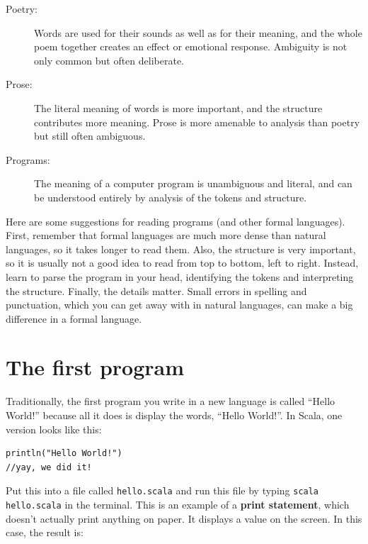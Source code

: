 \documentclass[10pt]{book}
\begin{document}
\begin{description}

\item[Poetry:] Words are used for their sounds as well as for their meaning, and the whole poem 
together creates an effect or emotional response.  Ambiguity is not only common but often deliberate.

\item[Prose:] The literal meaning of words is more important, and the structure contributes more 
meaning.  Prose is more amenable to analysis than poetry but still often ambiguous.

\item[Programs:] The meaning of a computer program is unambiguous and literal, and can be understood entirely by analysis of the tokens and structure.

\end{description}

Here are some suggestions for reading programs (and other formal languages).  First, remember that formal languages are much more dense than natural languages, so it takes longer to read them.  Also, the structure is very important, so it is usually not a good idea to read from top to bottom, left to right.  Instead, learn to parse the program in your head, identifying the tokens and interpreting the structure.  Finally, the details matter.  Small errors in spelling and punctuation, which you can get away with in natural languages, can make a big difference in a formal language.

\section{The first program}
\label{hello}


Traditionally, the first program you write in a new language is called ``Hello World!'' 
because all it does is display the words, ``Hello World!''.  In Scala, one version looks 
like this:

\beforeverb
\begin{verbatim}
println("Hello World!")
//yay, we did it!
\end{verbatim}
\afterverb

Put this into a file called {\tt hello.scala} and run this file by typing {\tt scala hello.scala} in the terminal. This is an example of a {\bf print statement}, which doesn't actually print anything on paper. It displays a value on the screen. In this case, the result is:
\end{document}
